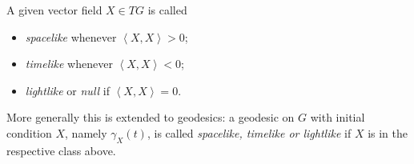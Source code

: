 \documentclass[12pt]{amsart}
\newcommand{\lela}{\left \langle}
\newcommand{\rira}{\right \rangle}
\theoremstyle{plain}
\theoremstyle{definition}
\theoremstyle{remark}
\newtheorem{exa}[thm]{Example}
\begin{document}
A given vector field  $X\in TG$  is called 
	\begin{itemize}
		\item {\em spacelike} whenever $\lela X,X \rira >0$;
		\item {\em timelike} whenever $\lela X,X \rira < 0$;
		\item {\em lightlike} or {\em null}  if  $\lela X,X \rira = 0$.
	\end{itemize}
More generally this is extended to geodesics: 	a geodesic on $G$ with  initial condition $X$, namely $\gamma_X(t)$, is called {\em spacelike, timelike or lightlike} if $X$ is in the respective class above. 

	
	
	
	
	
		
		
		
		
	
\end{document}
